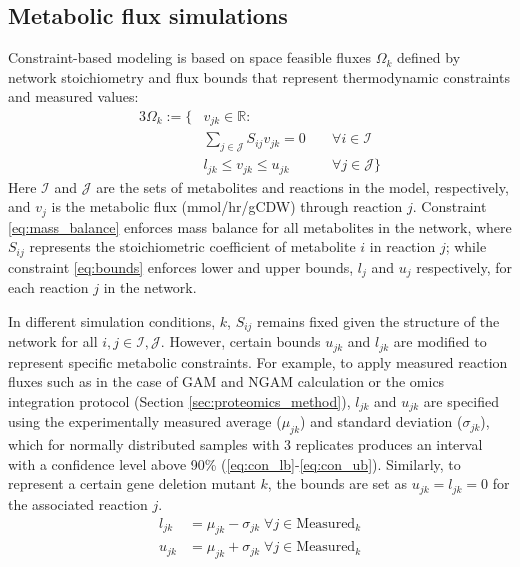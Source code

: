 \subsection{Metabolic flux simulations} \label{sec:flux_simulations}
Constraint-based modeling\citep{palsson2015} is based on space feasible fluxes $\Omega_k$ defined by network stoichiometry and flux bounds that represent thermodynamic constraints and measured values:
\begin{alignat}{3}
    \nonumber \Omega_k := \{& v_{jk} \in \mathbb{R}:\\
    & \sum_{j \in \mathcal{J}} S_{ij} v_{jk} = 0 \; && \forall i \in  \mathcal{I} \label{eq:mass_balance}\\
    & l_{jk} \le v_{jk} \le u_{jk} \; && \forall j \in  \mathcal{J} \} \label{eq:bounds}
\end{alignat}
Here $\mathcal{I}$ and $\mathcal{J}$ are the sets of metabolites and reactions in the model, respectively, and $v_j$ is the metabolic flux (mmol/hr/gCDW) through reaction $j$. Constraint \eqref{eq:mass_balance} enforces mass balance for all metabolites in the network, where $S_{ij}$ represents the stoichiometric coefficient of metabolite $i$ in reaction $j$; while constraint \eqref{eq:bounds} enforces lower and upper bounds, $l_j$ and $u_j$ respectively, for each reaction $j$ in the network.

In different simulation conditions, $k$, $S_{ij}$ remains fixed  given the structure of the network for all $i,j\in\mathcal{I},\mathcal{J}$. However, certain bounds $u_{jk}$ and $l_{jk}$ are modified to represent specific metabolic constraints. For example, to apply measured reaction fluxes such as in the case of GAM and NGAM calculation or the omics integration protocol (Section \ref{sec:proteomics_method}), $l_{jk}$ and $u_{jk}$ are specified using the experimentally measured average ($\mu_{jk}$) and standard deviation ($\sigma_{jk}$), which for normally distributed samples with 3 replicates produces an interval with a confidence level above 90\% (\ref{eq:con_lb}-\ref{eq:con_ub}). %
Similarly, to represent a certain gene deletion mutant $k$, the bounds are set as $u_{jk}=l_{jk}=0$ for the associated reaction $j$.
\begin{align}
    l_{jk} &= \mu_{jk} - \sigma_{jk} \;\forall j \in  \text{Measured}_k \label{eq:con_lb}\\
    u_{jk} &= \mu_{jk} + \sigma_{jk} \; \forall j \in  \text{Measured}_k \label{eq:con_ub}
\end{align}

